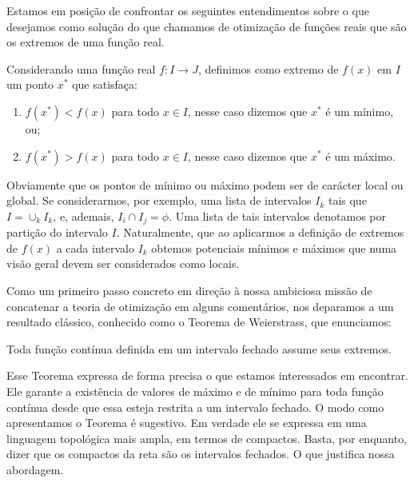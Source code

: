 \par Estamos em posição de confrontar os seguintes entendimentos sobre o que desejamos como solução do que chamamos de otimização de funções reais que são os extremos de uma função real. 

\begin{definition}[Extremos de $f(x)$]
  Considerando uma função real $f : I \rightarrow J$, definimos como extremo de $f(x)$ em $I$ um ponto $x^*$ que satisfaça:
  \begin{enumerate}
  \item $f(x^*) < f(x)$ para todo $x \in I$, nesse caso dizemos que $x^*$ é um mínimo, ou;
  \item $f(x^*) > f(x)$ para todo $x \in I$, nesse caso dizemos que $x^*$ é um máximo.
  \end{enumerate}
\end{definition}

\par Obviamente que os pontos de mínimo ou máximo podem ser de carácter local ou global. Se considerarmos, por exemplo, uma lista de intervalos $I_k$ tais que $I = \cup_{k} I_k$, e, ademais, $I_i \cap I_j = \phi$. Uma lista de tais intervalos denotamos por partição do intervalo $I$. Naturalmente, que ao aplicarmos a definição de extremos de $f(x)$ a cada intervalo $I_k$ obtemos potenciais mínimos e máximos que numa visão geral devem ser considerados como locais. 

\par Como um primeiro passo concreto em direção à nossa ambiciosa missão de concatenar a teoria de otimização em alguns comentários, nos deparamos a um resultado clássico, conhecido como o Teorema de Weierstrass, que enunciamos:

\begin{theorem}
  Toda função contínua definida em um intervalo fechado assume seus extremos.
\end{theorem}

\par Esse Teorema expressa de forma precisa o que estamos interessados em encontrar. Ele garante a existência de valores de máximo e de mínimo para toda função contínua desde que essa esteja restrita a um intervalo fechado. O modo como apresentamos o Teorema é sugestivo. Em verdade ele se expressa em uma linguagem topológica mais ampla, em termos de compactos. Basta, por enquanto, dizer que os compactos da reta são os intervalos fechados. O que justifica nossa abordagem.		

